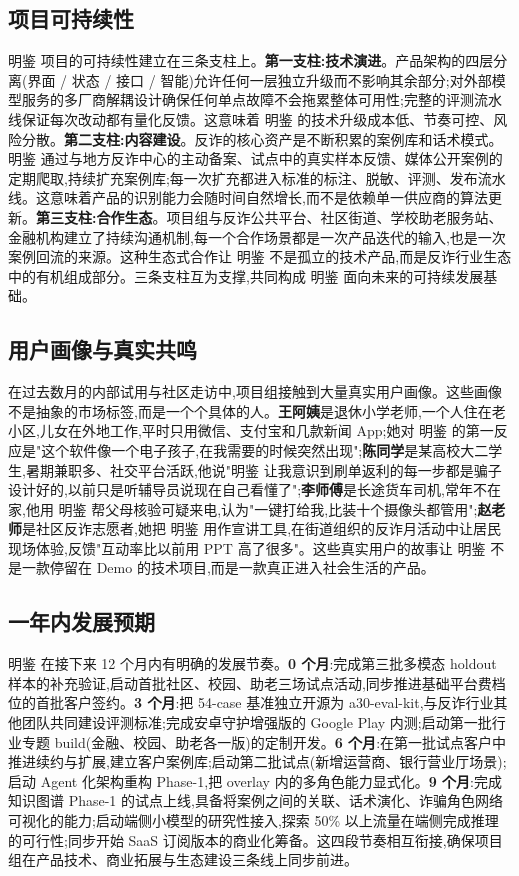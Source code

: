 \documentclass[UTF8,a4paper,12pt]{ctexart}
\begin{document}
\subsection{项目可持续性}

明鉴 项目的可持续性建立在三条支柱上。\textbf{第一支柱:技术演进}。产品架构的四层分离(界面 / 状态 / 接口 / 智能)允许任何一层独立升级而不影响其余部分;对外部模型服务的多厂商解耦设计确保任何单点故障不会拖累整体可用性;完整的评测流水线保证每次改动都有量化反馈。这意味着 明鉴 的技术升级成本低、节奏可控、风险分散。\textbf{第二支柱:内容建设}。反诈的核心资产是不断积累的案例库和话术模式。明鉴 通过与地方反诈中心的主动备案、试点中的真实样本反馈、媒体公开案例的定期爬取,持续扩充案例库;每一次扩充都进入标准的标注、脱敏、评测、发布流水线。这意味着产品的识别能力会随时间自然增长,而不是依赖单一供应商的算法更新。\textbf{第三支柱:合作生态}。项目组与反诈公共平台、社区街道、学校助老服务站、金融机构建立了持续沟通机制,每一个合作场景都是一次产品迭代的输入,也是一次案例回流的来源。这种生态式合作让 明鉴 不是孤立的技术产品,而是反诈行业生态中的有机组成部分。三条支柱互为支撑,共同构成 明鉴 面向未来的可持续发展基础。

\subsection{用户画像与真实共鸣}

在过去数月的内部试用与社区走访中,项目组接触到大量真实用户画像。这些画像不是抽象的市场标签,而是一个个具体的人。\textbf{王阿姨}是退休小学老师,一个人住在老小区,儿女在外地工作,平时只用微信、支付宝和几款新闻 App;她对 明鉴 的第一反应是"这个软件像一个电子孩子,在我需要的时候突然出现";\textbf{陈同学}是某高校大二学生,暑期兼职多、社交平台活跃,他说"明鉴 让我意识到刷单返利的每一步都是骗子设计好的,以前只是听辅导员说现在自己看懂了";\textbf{李师傅}是长途货车司机,常年不在家,他用 明鉴 帮父母核验可疑来电,认为"一键打给我,比装十个摄像头都管用";\textbf{赵老师}是社区反诈志愿者,她把 明鉴 用作宣讲工具,在街道组织的反诈月活动中让居民现场体验,反馈"互动率比以前用 PPT 高了很多"。这些真实用户的故事让 明鉴 不是一款停留在 Demo 的技术项目,而是一款真正进入社会生活的产品。

\subsection{一年内发展预期}

明鉴 在接下来 12 个月内有明确的发展节奏。\textbf{0 个月}:完成第三批多模态 holdout 样本的补充验证,启动首批社区、校园、助老三场试点活动,同步推进基础平台费档位的首批客户签约。\textbf{3 个月}:把 54-case 基准独立开源为 a30-eval-kit,与反诈行业其他团队共同建设评测标准;完成安卓守护增强版的 Google Play 内测;启动第一批行业专题 build(金融、校园、助老各一版)的定制开发。\textbf{6 个月}:在第一批试点客户中推进续约与扩展,建立客户案例库;启动第二批试点(新增运营商、银行营业厅场景);启动 Agent 化架构重构 Phase-1,把 overlay 内的多角色能力显式化。\textbf{9 个月}:完成知识图谱 Phase-1 的试点上线,具备将案例之间的关联、话术演化、诈骗角色网络可视化的能力;启动端侧小模型的研究性接入,探索 50\% 以上流量在端侧完成推理的可行性;同步开始 SaaS 订阅版本的商业化筹备。这四段节奏相互衔接,确保项目组在产品技术、商业拓展与生态建设三条线上同步前进。
\end{document}
